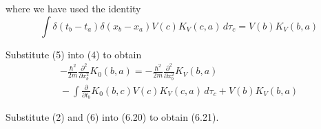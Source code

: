 where we have used the identity
\begin{equation*}
\int\delta(t_b-t_a)\delta(x_b-x_a)V(c)K_V(c,a)\,d\tau_c
=V(b)K_V(b,a)
\end{equation*}

Substitute (5) into (4) to obtain
\begin{multline*}
-\frac{\hbar^2}{2m}\frac{\partial^2}{\partial x_b^2}K_0(b,a)
=-\frac{\hbar^2}{2m}\frac{\partial^2}{\partial x_b^2}K_V(b,a)
\\
{}-\int\frac{\partial}{\partial t_b}K_0(b,c)V(c)K_V(c,a)\,d\tau_c
+V(b)K_V(b,a)
\tag{6}
\end{multline*}

Substitute (2) and (6) into (6.20) to obtain (6.21).


